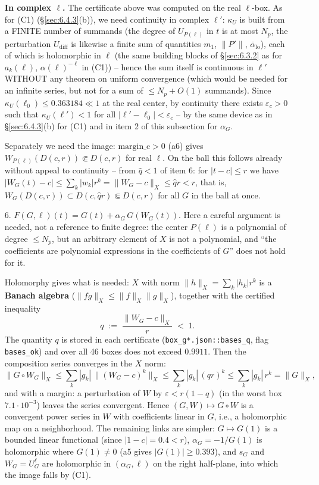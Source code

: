 \begin{enumerate}
   \textbf{In complex \boldmath$\ell$.} The certificate above was computed on the real $\ell$-box. As for (C1) (\S\ref{sec:6.4.3}(b)), we need continuity in complex $\ell'$: $\kappa_U$ is built from a FINITE number of summands (the degree of $U_{P(\ell)}$ in $t$ is at most $N_p$, the perturbation $U_{\mathrm{diff}}$ is likewise a finite sum of quantities $m_1$, $\|P'\|$, $\overline{\alpha}_{\mathrm{lo}}$), each of which is holomorphic in $\ell$ (the same building blocks of \S\ref{sec:6.3.2} as for $a_k(\ell)$, $\alpha(\ell)^{-\ell}$ in (C1)) -- hence the sum itself is continuous in $\ell'$ WITHOUT any theorem on uniform convergence (which would be needed for an infinite series, but not for a sum of $\le N_p{+}O(1)$ summands). Since $\kappa_U(\ell_0)\le0.363184\ll1$ at the real center, by continuity there exists $\varepsilon_c>0$ such that $\kappa_U(\ell')<1$ for all $|\ell'-\ell_0|<\varepsilon_c$ -- by the same device as in \S\ref{sec:6.4.3}(b) for (C1) and in item 2 of this subsection for $\alpha_G$.

   Separately we need the image: $\mathrm{margin\_c}>0$ (a6) gives $W_{P(\ell)}(D(c,r))\Subset D(c,r)$ for real $\ell$. On the ball this follows already without appeal to continuity -- from $\hat q<1$ of item 6: for $|t-c|\le r$ we have $|W_G(t)-c|\le\sum_k|w_k|r^k=\|W_G-c\|_X\le\hat qr<r$, that is, $W_G(D(c,r))\subset D(c,\hat qr)\Subset D(c,r)$ for all $G$ in the ball at once.

\item[6.] \textbf{$F(G,\ell)(t)=G(t)+\alpha_G\,G(W_G(t))$}. Here a careful argument is needed, not a reference to finite degree: the center $P(\ell)$ is a polynomial of degree $\le N_p$, but an arbitrary element of $X$ is not a polynomial, and ``the coefficients are polynomial expressions in the coefficients of $G$'' does not hold for it.

   Holomorphy gives what is needed: $X$ with norm $\|h\|_X=\sum_k|h_k|r^k$ is a \textbf{Banach algebra} ($\|fg\|_X\le\|f\|_X\|g\|_X$), together with the certified inequality
   \[
   q\;:=\;\frac{\|W_G-c\|_X}{r}\;<\;1 .
   \]
   The quantity $q$ is stored in each certificate (\texttt{box\_\allowbreak g*.json::\allowbreak bases\_\allowbreak q}, flag \texttt{bases\_ok}) and over all 46 boxes does not exceed $0.9911$. Then the composition series converges in the $X$ norm:
   \[
   \|G\circ W_G\|_X\le\sum_k|g_k|\,\|(W_G-c)^k\|_X
   \le\sum_k|g_k|\,(qr)^k\le\sum_k|g_k|\,r^k=\|G\|_X ,
   \]
   and with a margin: a perturbation of $W$ by $\varepsilon<r(1-q)$ (in the worst box $7.1\cdot10^{-3}$) leaves the series convergent. Hence $(G,W)\mapsto G\circ W$ is a convergent power series in $W$ with coefficients linear in $G$, i.e., a holomorphic map on a neighborhood. The remaining links are simpler: $G\mapsto G(1)$ is a bounded linear functional (since $|1-c|=0.4<r$), $\alpha_G=-1/G(1)$ is holomorphic where $G(1)\ne0$ (a5 gives $|G(1)|\ge0.393$), and $s_G$ and $W_G=U_G^{\ell}$ are holomorphic in $(\alpha_G,\ell)$ on the right half-plane, into which the image falls by (C1).


\end{enumerate}
